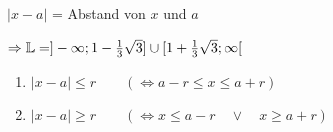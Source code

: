 \begin{enumerate}[A)]
\begin{minipage}{0.5\linewidth}
		\Allg \quad\\$|x-a|$ = Abstand von $x$ und $a$
	\end{minipage}
	
	$\Rightarrow \mathbb{L}=]-\infty;1 - \frac{1}{3}\sqrt{3}] \cup [1 + \frac{1}{3}\sqrt{3};\infty[$
	
	
	\Bem
	\begin{enumerate}
		\item $|x-a| \le r\qquad (\Leftrightarrow a-r \le x \le a+r)$
		\item $|x-a| \ge r\qquad (\Leftrightarrow x\le a-r \quad\lor\quad x \ge a+r)$
	\end{enumerate}
	
\end{enumerate}

